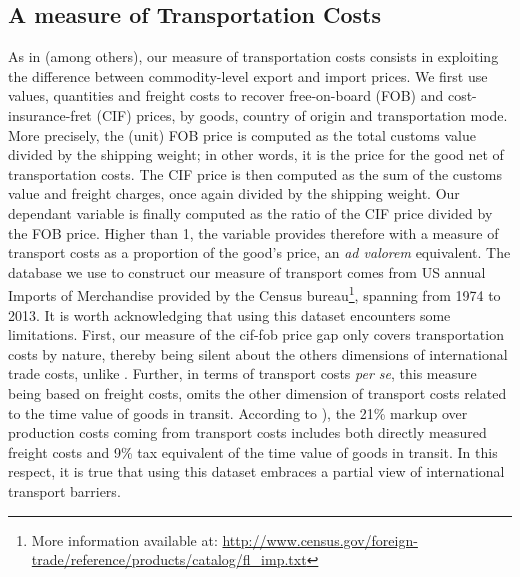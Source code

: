 \documentclass[a4paper,11pt]{article}
\begin{document}
\subsection{A measure of Transportation Costs}

As in \cite{hummels2007} (among others), our measure of transportation costs consists in exploiting the difference between commodity-level export and import prices.
We first use values, quantities and freight costs to recover free-on-board (FOB) and cost-insurance-fret (CIF) prices, by goods, country of origin and transportation mode. More precisely, the (unit) FOB price is computed as the total customs value divided by the shipping weight; in other words, it is the price for the good net of transportation costs. The CIF price is then computed as the sum of the customs value and freight charges, once again divided by the shipping weight. Our dependant variable is finally computed as the ratio of the CIF price divided by the FOB price. Higher than 1, the variable provides therefore with a measure of transport costs as a proportion of the good's price, an \emph{ad valorem} equivalent. The database we use to construct our measure of transport comes from US annual Imports of Merchandise provided by the Census bureau\footnote{More information available at: \url{http://www.census.gov/foreign-trade/reference/products/catalog/fl_imp.txt}}, spanning from 1974 to 2013. It is worth acknowledging that using this dataset encounters some limitations. First, our measure of the cif-fob price gap only covers transportation costs by nature, thereby being silent about the others dimensions of international trade costs, unlike \citet{Irrazabal_2015}.  Further, in terms of transport costs \textit{per se}, this measure being based on freight costs, omits the other dimension of transport costs related to the time value of goods in transit. According to \citet{anderson_wincoop_jel}), the 21\% markup over production costs coming from transport costs includes both directly measured freight costs and 9\% tax equivalent of the time value of goods in transit. In this respect, it is true that using this dataset embraces a partial view of international transport barriers.
\end{document}
